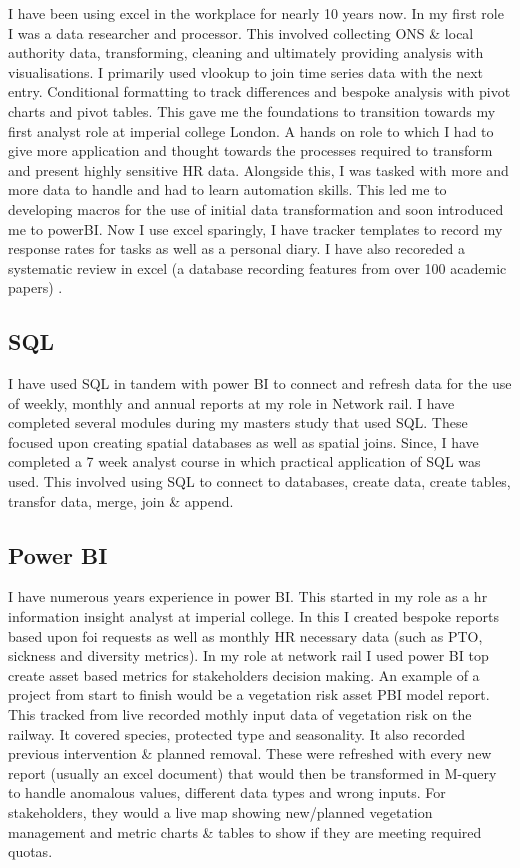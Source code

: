\documentclass[
  letterpaper,
]{scrbook}
\begin{document}
I have been using excel in the workplace for nearly 10 years now. In my
first role I was a data researcher and processor. This involved
collecting ONS \& local authority data, transforming, cleaning and
ultimately providing analysis with visualisations. I primarily used
vlookup to join time series data with the next entry. Conditional
formatting to track differences and bespoke analysis with pivot charts
and pivot tables. This gave me the foundations to transition towards my
first analyst role at imperial college London. A hands on role to which
I had to give more application and thought towards the processes
required to transform and present highly sensitive HR data. Alongside
this, I was tasked with more and more data to handle and had to learn
automation skills. This led me to developing macros for the use of
initial data transformation and soon introduced me to powerBI. Now I use
excel sparingly, I have tracker templates to record my response rates
for tasks as well as a personal diary. I have also recoreded a
systematic review in excel (a database recording features from over 100
academic papers) .

\subsection{SQL}\label{sql}

I have used SQL in tandem with power BI to connect and refresh data for
the use of weekly, monthly and annual reports at my role in Network
rail. I have completed several modules during my masters study that used
SQL. These focused upon creating spatial databases as well as spatial
joins. Since, I have completed a 7 week analyst course in which
practical application of SQL was used. This involved using SQL to
connect to databases, create data, create tables, transfor data, merge,
join \& append.

\subsection{Power BI}\label{power-bi}

I have numerous years experience in power BI. This started in my role as
a hr information insight analyst at imperial college. In this I created
bespoke reports based upon foi requests as well as monthly HR necessary
data (such as PTO, sickness and diversity metrics). In my role at
network rail I used power BI top create asset based metrics for
stakeholders decision making. An example of a project from start to
finish would be a vegetation risk asset PBI model report. This tracked
from live recorded mothly input data of vegetation risk on the railway.
It covered species, protected type and seasonality. It also recorded
previous intervention \& planned removal. These were refreshed with
every new report (usually an excel document) that would then be
transformed in M-query to handle anomalous values, different data types
and wrong inputs. For stakeholders, they would a live map showing
new/planned vegetation management and metric charts \& tables to show if
they are meeting required quotas.
\end{document}
